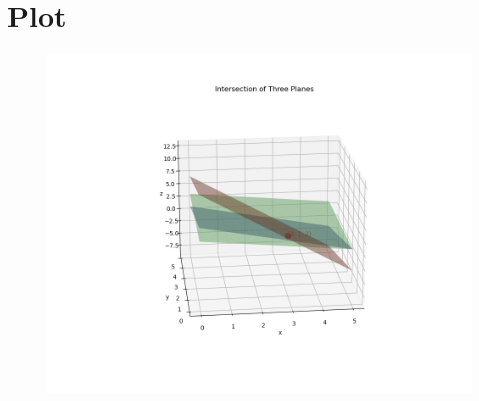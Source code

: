 \documentclass[14pt]{extarticle}
\begin{document}
\section*{Plot}
\begin{figure}[!h]
    \centering
    \includegraphics[width=1.2\columnwidth]{Figs/Figure_1.png}
\end{figure}
\end{document}

